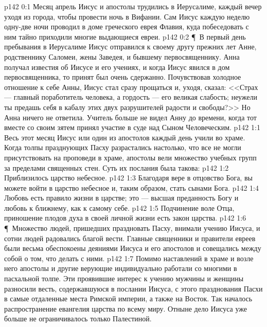 \vs p142 0:1 Месяц апрель Иисус и апостолы трудились в Иерусалиме, каждый вечер уходя из города, чтобы провести ночь в Вифании. Сам Иисус каждую неделю одну\hyp{}две ночи проводил в доме греческого еврея Флавия, куда побеседовать с ним тайно приходили многие выдающиеся евреи.
\vs p142 0:2 \P\ В первый день пребывания в Иерусалиме Иисус отправился к своему другу прежних лет Анне, родственнику Саломеи, жены Заведея, и бывшему первосвященнику. Анна получал известия об Иисусе и его учениях, и когда Иисус явился в дом первосвященника, то принят был очень сдержанно. Почувствовав холодное отношение к себе Анны, Иисус стал сразу прощаться и, уходя, сказал: <<Страх --- главный поработитель человека, а гордость --- его великая слабость; неужели ты предашь себя в кабалу этих двух разрушителей радости и свободы?>> Но Анна ничего не ответила. Учитель больше не видел Анну до времени, когда тот вместе со своим зятем принял участие в суде над Сыном Человеческим.
\vs p142 1:1 Весь этот месяц Иисус или один из апостолов каждый день учили во храме. Когда толпы празднующих Пасху разрастались настолько, что все не могли присутствовать на проповеди в храме, апостолы вели множество учебных групп за пределами священных стен. Суть их послания была такова:
\vs p142 1:2 \bibnobreakspace Приблизилось царство небесное.
\vs p142 1:3 \bibnobreakspace Благодаря вере в отцовство Бога, вы можете войти в царство небесное и, таким образом, стать сынами Бога.
\vs p142 1:4 \bibnobreakspace Любовь есть правило жизни в царстве; это --- высшая преданность Богу и любовь к ближнему, как к самому себе.
\vs p142 1:5 \bibnobreakspace Подчинение воле Отца, приношение плодов духа в своей личной жизни есть закон царства.
\vs p142 1:6 \P\ Множество людей, пришедших праздновать Пасху, внимали учению Иисуса, и сотни людей радовались благой вести. Главные священники и правители евреев были весьма обеспокоены деяниями Иисуса и его апостолов и совещались между собой о том, что делать с ними.
\vs p142 1:7 Помимо наставлений в храме и возле него апостолы и другие верующие индивидуально работали со многими в пасхальной толпе. Эти проявившие интерес к учению мужчины и женщины разносили весть, содержавшуюся в послании Иисуса, с этого празднования Пасхи в самые отдаленные места Римской империи, а также на Восток. Так началось распространение евангелия царства по всему миру. Отныне дело Иисуса уже больше не ограничивалось только Палестиной.

